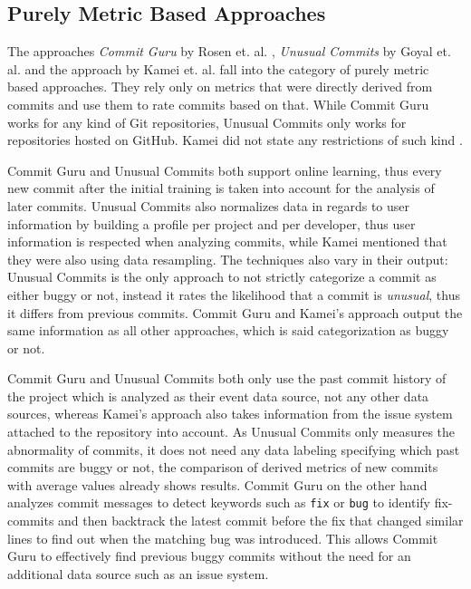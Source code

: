 \subsection{Purely Metric Based Approaches}
\label{sec:comparison-metricbased}

The approaches \textit{Commit Guru} by Rosen et. al. \cite{Rosen2015}, \textit{Unusual Commits} by Goyal et. al. \cite{Goyal2017} and the approach by Kamei et. al. \cite{Kamei2013} fall into the category of purely metric based approaches. They rely only on metrics that were directly derived from commits and use them to rate commits based on that. While Commit Guru works for any kind of Git repositories, Unusual Commits only works for repositories hosted on GitHub. Kamei did not state any restrictions of such kind \cite{Kamei2013}.

Commit Guru and Unusual Commits both support online learning, thus every new commit after the initial training is taken into account for the analysis of later commits.
Unusual Commits also normalizes data in regards to user information by building a profile per project and per developer, thus user information is respected when analyzing commits, 
while Kamei mentioned that they were also using data resampling.
The techniques also vary in their output: Unusual Commits is the only approach to not strictly categorize a commit as either buggy or not, instead it rates the likelihood that a commit is \textit{unusual}, thus it differs from previous commits. Commit Guru and Kamei's approach output the same information as all other approaches, which is said categorization as buggy or not.

Commit Guru and Unusual Commits both only use the past commit history of the project which is analyzed as their event data source, not any other data sources, whereas Kamei's approach also takes information from the issue system attached to the repository into account.
As Unusual Commits only measures the abnormality of commits, it does not need any data labeling specifying which past commits are buggy or not, the comparison of derived metrics of new commits with average values already shows results.
Commit Guru on the other hand analyzes commit messages to detect keywords such as \texttt{fix} or \texttt{bug} to identify fix-commits and then backtrack the latest commit before the fix that changed similar lines to find out when the matching bug was introduced. This allows Commit Guru to effectively find previous buggy commits without the need for an additional data source such as an issue system.


